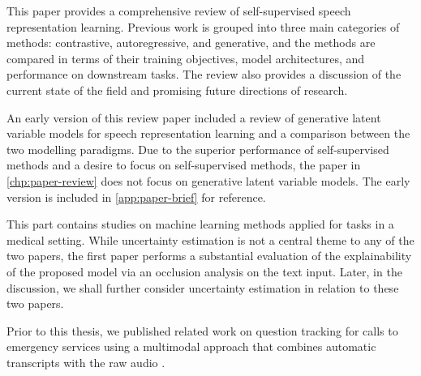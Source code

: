 

This paper provides a comprehensive review of self-supervised speech representation learning. Previous work is grouped into three main categories of methods: contrastive, autoregressive, and generative, and the methods are compared in terms of their training objectives, model architectures, and performance on downstream tasks. The review also provides a discussion of the current state of the field and promising future directions of research. 

An early version of this review paper \cite{borgholt_brief_2022} included a review of generative latent variable models for speech representation learning and a comparison between the two modelling paradigms. Due to the superior performance of self-supervised methods and a desire to focus on self-supervised methods, the paper in \cref{chp:paper-review} does not focus on generative latent variable models. The early version is included in \cref{app:paper-brief} for reference.


 
This part contains studies on machine learning methods applied for tasks in a medical setting. While uncertainty estimation is not a central theme to any of the two papers, the first paper performs a substantial evaluation of the explainability of the proposed model via an occlusion analysis on the text input. Later, in the discussion, we shall further consider uncertainty estimation in relation to these two papers.

Prior to this thesis, we published related work on question tracking for calls to emergency services using a multimodal approach that combines automatic transcripts with the raw audio \cite{havtorn_multiqt_2020}. 


